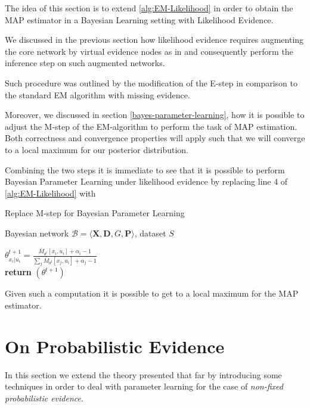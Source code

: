 \documentclass[11pt]{article}
\begin{document}
\begin{article}
The idea of this section is to extend \ref{alg:EM-Likelihood} in
order to obtain the MAP estimator in a Bayesian Learning setting
with Likelihood Evidence.

We discussed in the previous section how likelihood evidence
requires augmenting the core network by virtual evidence nodes as
in \cite{pearl2014probabilistic} and consequently perform the
inference step on such augmented networks.

Such procedure was outlined by the modification of the E-step in
comparison to the standard EM algorithm with missing evidence.

Moreover, we discussed in section \ref{bayes-parameter-learning}, how
it is possible to adjust the M-step of the EM-algorithm to perform
the task of MAP estimation. Both correctness and convergence
properties will apply such that we will converge to a local maximum
for our posterior distribution.

Combining the two steps it is immediate to see that it is possible
to perform Bayesian Parameter Learning under likelihood evidence
by replacing line 4 of \ref{alg:EM-Likelihood} with 

\begin{algorithm*}[h!]
\caption{Replace M-step for Bayesian Parameter Learning}
\label{alg:Bayes-EM-Likelihood}
\vspace{-10pt}
\begin{multicols}{2}
\begin{algorithmic}[1] 
\Require Bayesian network $\mathcal{B}=\langle \mathbf{X},\mathbf{D}, G, \mathbf{P} \rangle$, dataset $S$ 

   \State $\theta_{x_{i}|u_{i}}^{t+1}=\frac{\bar{M}_{\theta^{t}}[x_{i},u_{i}] + \alpha_i - 1}{\sum_j \bar{M}_{\theta^{t}}[x_{j},u_{i}] + \alpha_j - 1}$\\
   
   \textbf{return} $(\theta^{t+1})$

\end{algorithmic}
\end{multicols}
\end{algorithm*}

Given such a computation it is possible to get to a local maximum
for the MAP estimator.

\newpage

\section{On Probabilistic Evidence}
\label{probabilistic-em}
In this section we extend the theory presented that far by
introducing some techniques in order to deal with parameter learning
for the case of \emph{non-fixed probabilistic evidence}.


\end{article}
\end{document}
